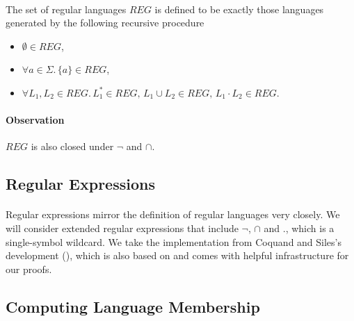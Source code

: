 \documentclass[11pt,a4paper,oneside]{book}
\begin{document}
            \paragraph{}
            The set of regular languages $REG$ is defined to be exactly those languages generated by the following recursive procedure
            \begin{itemize}
                \item
                    $\emptyset \in REG$, 
                \item
                    $\forall a \in \Sigma. \, \{a\} \in REG$, 
                \item
                    $\forall L_1, L_2 \in REG. \, L_1^* \in REG, \, L_1 \cup L_2 \in REG, \, L_1 \cdot L_2 \in REG$.
            \end{itemize}

            \paragraph{Observation} $REG$ is also closed under $\neg$ and $\cap$.


        \subsection{Regular Expressions}

                \paragraph{} 
                Regular expressions mirror the definition of regular languages very closely. We will consider extended regular expressions that include $\neg$, $\cap$ and $.$, which is a single-symbol wildcard. 
                We take the implementation from Coquand and Siles's development (\cite{DBLP:conf/cpp/CoquandS11}), which is also based on \ssreflect and comes with helpful infrastructure for our proofs.


                \subsection{Computing Language Membership}
\end{document}
